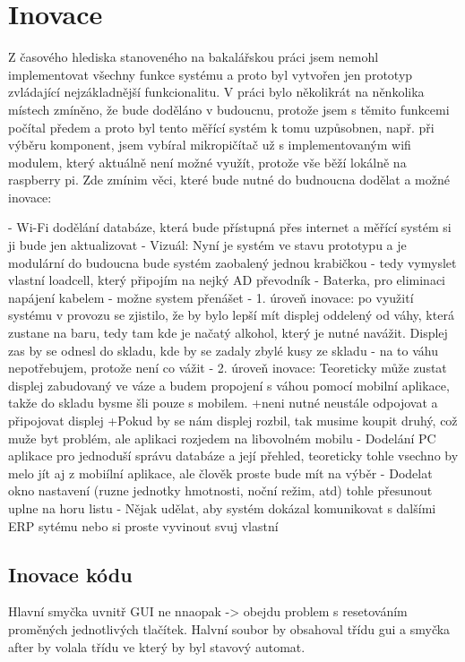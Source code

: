 

\chapter{Inovace}
Z časového hlediska stanoveného na bakalářskou práci jsem nemohl implementovat všechny funkce systému a proto byl vytvořen jen prototyp zvládající nejzákladnější funkcionalitu.
V práci bylo několikrát na něnkolika místech zmíněno, že bude doděláno v budoucnu, protože jsem s těmito funkcemi počítal předem a proto byl tento měřící systém k tomu uzpůsobnen, např. při výběru komponent, jsem vybíral mikropičítač už s implementovaným wifi modulem, který aktuálně není možné využít, protože vše běží lokálně na raspberry pi.
Zde zmínim věci, které bude nutné do budnoucna dodělat a možné inovace:

- Wi-Fi dodělání databáze, která bude přístupná přes internet a měřící systém si ji bude jen aktualizovat
- Vizuál: Nyní je systém ve stavu prototypu a je modulární do budoucna bude systém zaobalený jednou krabičkou - tedy vymyslet vlastní loadcell, který připojím na nejký AD převodník
- Baterka, pro eliminaci napájení kabelem - možne system přenášet 
- 1. úroveň inovace: po využití systému v provozu se zjistilo, že by bylo lepší mít displej oddelený od váhy, která zustane na baru, tedy tam kde je načatý alkohol, který je nutné navážit. Displej zas by se odnesl do skladu, kde by se zadaly zbylé kusy ze skladu - na to váhu nepotřebujem, protože není co vážit
- 2. úroveň inovace: Teoreticky může zustat displej zabudovaný ve váze a budem propojení s váhou pomocí mobilní aplikace, takže do skladu bysme šli pouze s mobilem.
    +neni nutné neustále odpojovat a připojovat displej
    +Pokud by se nám displej rozbil, tak musime koupit druhý, což muže byt problém, ale aplikaci rozjedem na libovolném mobilu
- Dodelání PC aplikace pro jednoduší správu databáze a její přehled, teoreticky tohle vsechno by melo jít aj z mobiílní aplikace, ale člověk proste bude mít na výběr 
- Dodelat okno nastavení (ruzne jednotky hmotnosti, noční režim, atd) tohle přesunout uplne na horu listu
- Nějak udělat, aby systém dokázal komunikovat s dalšími ERP sytému nebo si proste vyvinout svuj vlastní

\section{Inovace kódu}

Hlavní smyčka uvnitř GUI ne nnaopak -> obejdu problem s resetováním proměných jednotlivých tlačítek. Halvní soubor by obsahoval třídu gui a smyčka after by volala třídu ve který by byl stavový automat.

